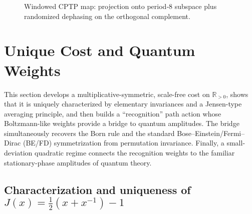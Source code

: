 \documentclass[12pt,a4paper]{article}
\theoremstyle{definition}
\theoremstyle{remark}
\begin{document}
\begin{figure}[t]
  \centering
  \caption{Windowed CPTP map: projection onto period‑8 subspace plus randomized dephasing on the orthogonal complement.}
  \label{fig:kraus}
\end{figure}

\setcounter{section}{4}
\section{Unique Cost and Quantum Weights}

This section develops a multiplicative-symmetric, scale-free cost on \(\mathbb{R}_{>0}\), shows that it is uniquely characterized by elementary invariances and a Jensen-type averaging principle, and then builds a ``recognition'' path action whose Boltzmann-like weights provide a bridge to quantum amplitudes. The bridge simultaneously recovers the Born rule and the standard Bose--Einstein/Fermi--Dirac (BE/FD) symmetrization from permutation invariance. Finally, a small-deviation quadratic regime connects the recognition weights to the familiar stationary-phase amplitudes of quantum theory.

\subsection{Characterization and uniqueness of \texorpdfstring{$J(x)=\tfrac12(x+x^{-1})-1$}{J(x) = (1/2)(x + x^{-1}) - 1}}
\label{sec:unique-J}
\end{document}
